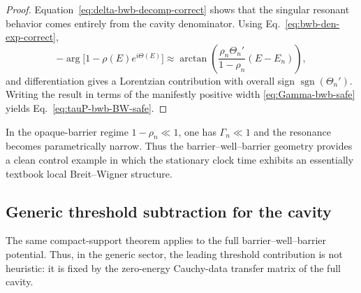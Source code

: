 \documentclass[aps,pra,preprint,notitlepage,nofootinbib]{revtex4-2}
\begin{document}
\begin{proof}
Equation~\eqref{eq:delta-bwb-decomp-correct} shows that the singular resonant behavior comes entirely from the cavity denominator. Using Eq.~\eqref{eq:bwb-den-exp-correct},
\begin{equation}
-\arg\!\big[1-\rho(E)e^{i\Theta(E)}\big]
\approx
\arctan\!\left(
\frac{\rho_n\Theta_n'}{1-\rho_n}(E-E_n)
\right),
\end{equation}
and differentiation gives a Lorentzian contribution with overall sign $\operatorname{sgn}(\Theta_n')$. Writing the result in terms of the manifestly positive width \eqref{eq:Gamma-bwb-safe} yields Eq.~\eqref{eq:tauP-bwb-BW-safe}.
\end{proof}

In the opaque-barrier regime $1-\rho_n\ll1$, one has $\Gamma_n\ll1$ and the resonance becomes parametrically narrow. Thus the barrier--well--barrier geometry provides a clean control example in which the stationary clock time exhibits an essentially textbook local Breit--Wigner structure.

\subsection{Generic threshold subtraction for the cavity}

The same compact-support theorem applies to the full barrier--well--barrier
potential. Thus, in the generic sector, the leading threshold contribution is
not heuristic: it is fixed by the zero-energy Cauchy-data transfer matrix of the
full cavity.
\end{document}
